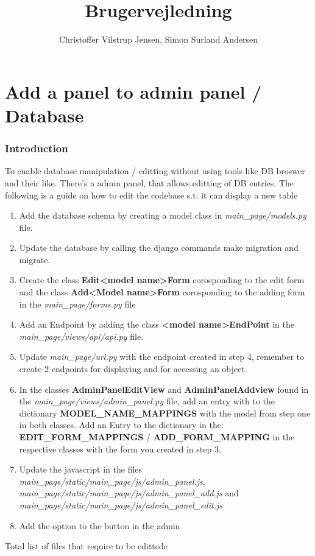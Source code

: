 \documentclass{article}
\author{Christoffer Vilstrup Jensen, Simon Surland Andersen}
\title{Brugervejledning}
\begin{document}
\section{Add a panel to admin panel / Database}

\subsubsection*{Introduction}
To enable database manipulation / editting without using tools like DB broswer and their like. There's a admin panel, that allows editting of DB entries. The following is a guide on how to edit the codebase s.t. it can display a new table

\begin{enumerate}
	\item Add the database schema by creating a model class in \textit{main\_page/models.py} file.
	\item Update the database by calling the django commands make migration and migrate.
	\item Create the class \textbf{Edit<model name>Form} corosponding to the edit form and the class \textbf{Add<Model name>Form} corosponding to the adding form in the \textit{main\_page/forms.py} file
	\item Add an Endpoint by adding the class \textbf{<model name>EndPoint} in the \textit{main\_page/views/api/api.py} file.
	\item Update \textit{main\_page/url.py} with the endpoint created in step 4, remember to create 2 endpoints for displaying and for accessing an object. 
	\item In the classes \textbf{AdminPanelEditView} and \textbf{AdminPanelAddview} found in the \textit{main\_page/views/admin\_panel.py} file, add an entry with to the dictionary \textbf{MODEL\_NAME\_MAPPINGS} with the model from step one in both classes. Add an Entry to the dictionary in the:\\ \textbf{EDIT\_FORM\_MAPPINGS} / \textbf{ADD\_FORM\_MAPPING} in the respective classes with the form you created in step 3.
	 \item Update the javascript in the files \textit{main\_page/static/main\_page/js/admin\_panel.js}, \textit{main\_page/static/main\_page/js/admin\_panel\_add.js} and\\ \textit{main\_page/static/main\_page/js/admin\_panel\_edit.js}
	 \item Add the option to the button in the admin
\end{enumerate} 
Total list of files that require to be edittede 
\end{document}

